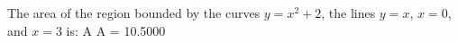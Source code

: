 The area of the region bounded by the curves $y = x^2 + 2$, the lines $y = x$, $x = 0$, and $x = 3$ is: A
A = 10.5000

